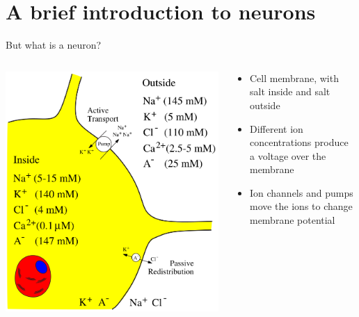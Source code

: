 \documentclass[presentation]{beamer}
\begin{document}
\section{A brief introduction to neurons}
\label{sec:org961d694}
\begin{frame}[label={sec:org7a1cf6e}]{But what is a neuron?}
\begin{columns}
\begin{column}{0.4\columnwidth}
\begin{center}
\includegraphics[width=.9\linewidth]{./neuron_diagram.png}
\end{center}    
\end{column}

\begin{column}{0.6\columnwidth}
\begin{itemize}
\item Cell membrane, with salt inside and salt outside
\item Different ion concentrations produce a voltage over the membrane
\item Ion channels and pumps move the ions to change membrane potential
\end{itemize}
\end{column}
\end{columns}
\end{frame}
\end{document}
